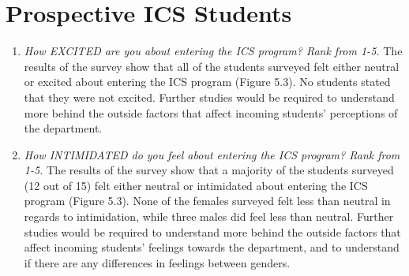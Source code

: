 \section{Prospective ICS Students}
\begin{enumerate}
\begin{figure}[h]
\centering
\texttt{[image: sr-excited-intimidated]}
\caption{Results for prospective ICS Students survey}
\end{figure}
\item\textit{How EXCITED are you about entering the ICS program? Rank from 1-5.}
The results of the survey show that all of the students surveyed felt either neutral or excited about entering the ICS program (Figure 5.3). No students stated that they were not excited. Further studies would be required to understand more behind the outside factors that affect incoming students' perceptions of the department. 
\item \textit{How INTIMIDATED do you feel about entering the ICS program? Rank from 1-5.}
The results of the survey show that a majority of the students surveyed (12 out of 15) felt either neutral or intimidated about entering the ICS program (Figure 5.3). None of the females surveyed felt less than neutral in regards to intimidation, while three males did feel less than neutral. Further studies would be required to understand more behind the outside factors that affect incoming students' feelings towards the department, and to understand if there are any differences in feelings between genders.
\end{enumerate}

